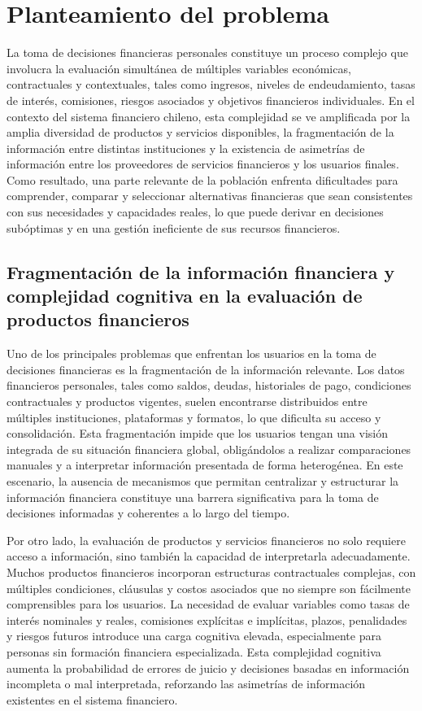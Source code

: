 \documentclass[
	spanish, %
	letterpaper, oneside
]{book}
\begin{document}
\section{Planteamiento del problema}

La toma de decisiones financieras personales constituye un proceso complejo que involucra la evaluación simultánea de múltiples variables económicas, contractuales y contextuales, tales como ingresos, niveles de endeudamiento, tasas de interés, comisiones, riesgos asociados y objetivos financieros individuales. En el contexto del sistema financiero chileno, esta complejidad se ve amplificada por la amplia diversidad de productos y servicios disponibles, la fragmentación de la información entre distintas instituciones y la existencia de asimetrías de información entre los proveedores de servicios financieros y los usuarios finales. Como resultado, una parte relevante de la población enfrenta dificultades para comprender, comparar y seleccionar alternativas financieras que sean consistentes con sus necesidades y capacidades reales, lo que puede derivar en decisiones subóptimas y en una gestión ineficiente de sus recursos financieros.

\subsection{Fragmentación de la información financiera y complejidad cognitiva en la evaluación de productos financieros}

Uno de los principales problemas que enfrentan los usuarios en la toma de decisiones financieras es la fragmentación de la información relevante. Los datos financieros personales, tales como saldos, deudas, historiales de pago, condiciones contractuales y productos vigentes, suelen encontrarse distribuidos entre múltiples instituciones, plataformas y formatos, lo que dificulta su acceso y consolidación. Esta fragmentación impide que los usuarios tengan una visión integrada de su situación financiera global, obligándolos a realizar comparaciones manuales y a interpretar información presentada de forma heterogénea. En este escenario, la ausencia de mecanismos que permitan centralizar y estructurar la información financiera constituye una barrera significativa para la toma de decisiones informadas y coherentes a lo largo del tiempo.

Por otro lado, la evaluación de productos y servicios financieros no solo requiere acceso a información, sino también la capacidad de interpretarla adecuadamente. Muchos productos financieros incorporan estructuras contractuales complejas, con múltiples condiciones, cláusulas y costos asociados que no siempre son fácilmente comprensibles para los usuarios. La necesidad de evaluar variables como tasas de interés nominales y reales, comisiones explícitas e implícitas, plazos, penalidades y riesgos futuros introduce una carga cognitiva elevada, especialmente para personas sin formación financiera especializada. Esta complejidad cognitiva aumenta la probabilidad de errores de juicio y decisiones basadas en información incompleta o mal interpretada, reforzando las asimetrías de información existentes en el sistema financiero.
\end{document}
